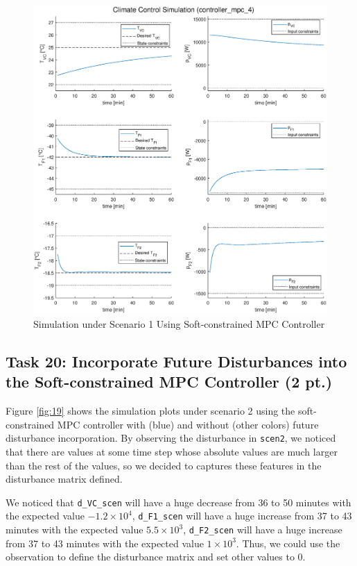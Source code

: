 \documentclass[a4paper,twoside,11pt]{article}
\numberwithin{equation}{section}
\begin{document}
\begin{figure}[ht]
\centering
\includegraphics[scale = 0.58]{image/19-2.eps}
\caption{Simulation under Scenario 1 Using Soft-constrained MPC Controller}
\label{fig:18}
\end{figure}

\subsection{Task 20: Incorporate Future Disturbances into the Soft-constrained MPC Controller (2 pt.)}

Figure \ref{fig:19} shows the simulation plots under scenario 2 using the soft-constrained MPC controller with (blue) and without (other colors) future disturbance incorporation. By observing the disturbance in \verb|scen2|, we noticed that there are values at some time step whose absolute values are much larger than the rest of the values, so we decided to captures these features in the  disturbance matrix defined. 

We noticed that \verb|d_VC_scen| will have a huge decrease from 36 to 50 minutes with the expected value $-1.2\times10^{4}$, \verb|d_F1_scen| will have a huge increase from 37 to 43 minutes with the expected value $5.5\times 10^{3}$, \verb|d_F2_scen| will have a huge increase from 37 to 43 minutes with the expected value $1\times 10^{3}$. Thus, we could use the observation to define the disturbance matrix and set other values to 0. 
\end{document}
